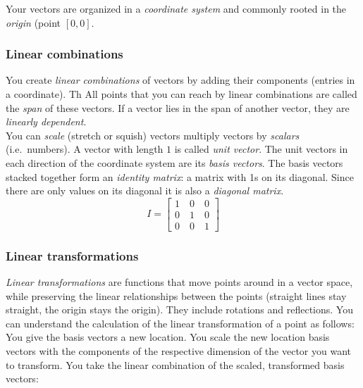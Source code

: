 \documentclass[
]{book}
\begin{document}
Your vectors are organized in a \emph{coordinate system} and commonly rooted
in the \emph{origin} (point \([0,0]\).\\

\hypertarget{linear-combinations}{%
\subsubsection{Linear combinations}\label{linear-combinations}}

You create \emph{linear combinations} of vectors by adding their components
(entries in a coordinate). Th All points that you can reach by linear
combinations are called the \emph{span} of these vectors. If a vector lies in
the span of another vector, they are \emph{linearly dependent}.\\
You can \emph{scale} (stretch or squish) vectors multiply vectors by
\emph{scalars} (i.e.~numbers). A vector with length \(1\) is called \emph{unit
vector}. The unit vectors in each direction of the coordinate system are
its \emph{basis vectors}. The basis vectors stacked together form an
\emph{identity matrix}: a matrix with 1s on its diagonal. Since there are
only values on its diagonal it is also a \emph{diagonal matrix}.\\

\[
I = \begin{bmatrix}
1 \quad 0 \quad 0 \\
0 \quad 1 \quad 0 \\
0 \quad 0 \quad 1
\end{bmatrix}
\]

\hypertarget{linear-transformations}{%
\subsubsection{Linear transformations}\label{linear-transformations}}

\emph{Linear transformations} are functions that move points around in a
vector space, while preserving the linear relationships between the
points (straight lines stay straight, the origin stays the origin). They
include rotations and reflections. You can understand the calculation of
the linear transformation of a point as follows: You give the basis
vectors a new location. You scale the new location basis vectors with
the components of the respective dimension of the vector you want to
transform. You take the linear combination of the scaled, transformed
basis vectors:
\end{document}
